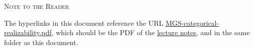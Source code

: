 \documentclass[a4paper, oneside, 12pt, openany]{book}
\begin{document}
\frontmatter



\thispagestyle{empty}
\begin{center}
  \textsc{Note to the Reader}
\end{center}
The hyperlinks in this document reference the URL
\href{MGS-categorical-realizability.pdf}{MGS-categorical-realizability.pdf},
which should be the PDF of the
\href{https://github.com/tomdjong/MGS-categorical-realizability/blob/main/MGS-categorical-realizability.pdf?raw=1}{lecture notes},
and in the same folder as this document.

\restoregeometry

\mainmatter



\end{document}
